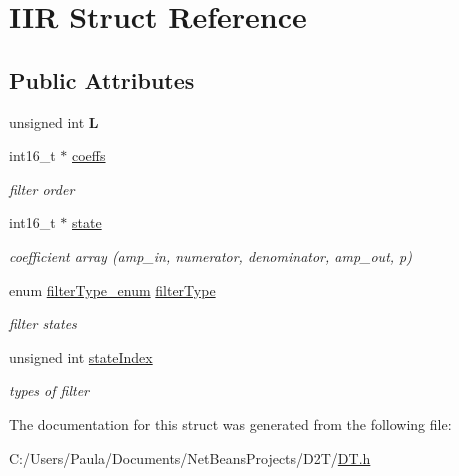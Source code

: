 \hypertarget{struct_i_i_r}{}\section{I\+IR Struct Reference}
\label{struct_i_i_r}
\subsection*{Public Attributes}
\begin{DoxyCompactItemize}
\item 
\mbox{\label{struct_i_i_r_a4682fe17f9e95205cafb0a80b189ebd7}} 
unsigned int {\bfseries L}
\item 
\mbox{\label{struct_i_i_r_a0175e9823a0e61a4a7b6c284a86f20a5}} 
int16\+\_\+t $\ast$ \mbox{\hyperlink{struct_i_i_r_a0175e9823a0e61a4a7b6c284a86f20a5}{coeffs}}
\begin{DoxyCompactList}\small\item\em filter order \end{DoxyCompactList}\item 
\mbox{\label{struct_i_i_r_af09fb385616f35623ac124cb30d29cd3}} 
int16\+\_\+t $\ast$ \mbox{\hyperlink{struct_i_i_r_af09fb385616f35623ac124cb30d29cd3}{state}}
\begin{DoxyCompactList}\small\item\em coefficient array (amp\+\_\+in, numerator, denominator, amp\+\_\+out, p) \end{DoxyCompactList}\item 
\mbox{\label{struct_i_i_r_a337548c6f2087310a25e5818c40fbfaf}} 
enum \mbox{\hyperlink{_d_t_8h_a1ed18b9b39cbafea28f6e34f6d256d35}{filter\+Type\+\_\+enum}} \mbox{\hyperlink{struct_i_i_r_a337548c6f2087310a25e5818c40fbfaf}{filter\+Type}}
\begin{DoxyCompactList}\small\item\em filter states \end{DoxyCompactList}\item 
\mbox{\label{struct_i_i_r_aa0ee40bdddef1aa5df50b0d50116b091}} 
unsigned int \mbox{\hyperlink{struct_i_i_r_aa0ee40bdddef1aa5df50b0d50116b091}{state\+Index}}
\begin{DoxyCompactList}\small\item\em types of filter \end{DoxyCompactList}\end{DoxyCompactItemize}


The documentation for this struct was generated from the following file\+:\begin{DoxyCompactItemize}
\item 
C\+:/\+Users/\+Paula/\+Documents/\+Net\+Beans\+Projects/\+D2\+T/\mbox{\hyperlink{_d_t_8h}{D\+T.\+h}}\end{DoxyCompactItemize}
